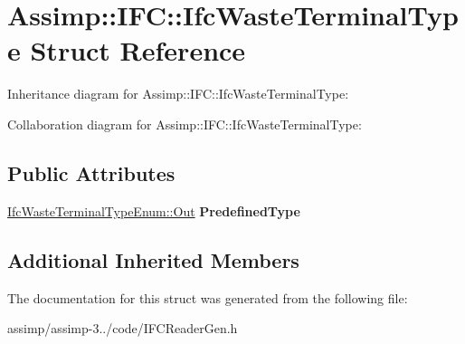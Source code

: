 \hypertarget{struct_assimp_1_1_i_f_c_1_1_ifc_waste_terminal_type}{\section{Assimp\+:\+:I\+F\+C\+:\+:Ifc\+Waste\+Terminal\+Type Struct Reference}
\label{struct_assimp_1_1_i_f_c_1_1_ifc_waste_terminal_type}
}


Inheritance diagram for Assimp\+:\+:I\+F\+C\+:\+:Ifc\+Waste\+Terminal\+Type\+:


Collaboration diagram for Assimp\+:\+:I\+F\+C\+:\+:Ifc\+Waste\+Terminal\+Type\+:
\subsection*{Public Attributes}
\begin{DoxyCompactItemize}
\item 
\hypertarget{struct_assimp_1_1_i_f_c_1_1_ifc_waste_terminal_type_acb0d41c8b9e9f273d19aa8715c56ad9c}{\hyperlink{classboost_1_1shared__ptr}{Ifc\+Waste\+Terminal\+Type\+Enum\+::\+Out} {\bfseries Predefined\+Type}}\label{struct_assimp_1_1_i_f_c_1_1_ifc_waste_terminal_type_acb0d41c8b9e9f273d19aa8715c56ad9c}

\end{DoxyCompactItemize}
\subsection*{Additional Inherited Members}


The documentation for this struct was generated from the following file\+:\begin{DoxyCompactItemize}
\item 
assimp/assimp-\/3../code/I\+F\+C\+Reader\+Gen.\+h\end{DoxyCompactItemize}

